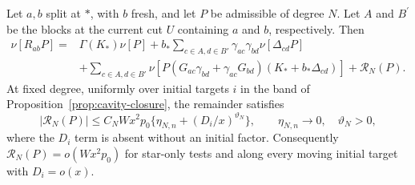 \begin{lemma}\label{lem:cavity-row-identity}
Let \(a,b\) split at \(*\), with \(b\) fresh, and let
\(P\) be admissible of degree \(N\). Let \(A\) and \(B^{\prime}\)
be the blocks at the current cut \(U\) containing \(a\) and \(b\),
respectively. Then
\begin{equation}\label{eq:24}\tag{24}
 \begin{split}
 \nu[R_{ab}P]={}&\Gamma(K_*)\nu[P]
  +b_*\sum_{c\in A,d\in B'}\gamma_{ac}\gamma_{bd}
                                             \nu[\Delta_{cd}P]\\
 &+\sum_{c\in A,d\in B'}
   \nu[P(G_{ac}\gamma_{bd}+\gamma_{ac}G_{bd})
                                     (K_*+b_*\Delta_{cd})]
   +\mathcal R_N(P).
 \end{split}
\end{equation}
At fixed degree, uniformly over initial targets \(i\) in the band
of Proposition~\ref{prop:cavity-closure}, the remainder satisfies
\[
 |\mathcal R_N(P)|\le
 C_NWx^2p_0\{\eta_{N,n}+(D_i/x)^{\vartheta_N}\},\qquad
       \eta_{N,n}\to0,\quad\vartheta_N>0,
\]
where the \(D_i\) term is absent without an initial factor.
Consequently \(\mathcal R_N(P)=o(Wx^2p_0)\) for star-only tests
and along every moving initial target with \(D_i=o(x)\).
\end{lemma}

